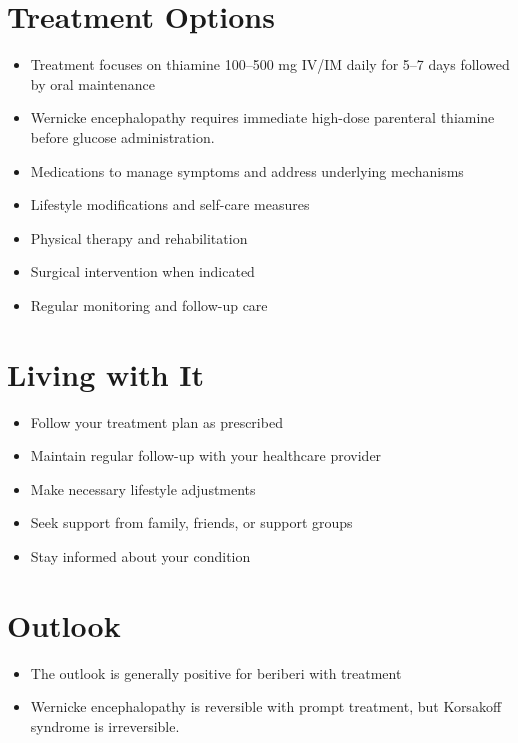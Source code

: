 \section{Treatment Options}
\begin{itemize}[noitemsep]
  \item Treatment focuses on thiamine 100--500 mg IV/IM daily for 5--7 days followed by oral maintenance
  \item Wernicke encephalopathy requires immediate high-dose parenteral thiamine before glucose administration.
  \item Medications to manage symptoms and address underlying mechanisms
  \item Lifestyle modifications and self-care measures
  \item Physical therapy and rehabilitation
  \item Surgical intervention when indicated
  \item Regular monitoring and follow-up care
\end{itemize}
\section{Living with It}
\begin{itemize}[noitemsep]
  \item Follow your treatment plan as prescribed
  \item Maintain regular follow-up with your healthcare provider
  \item Make necessary lifestyle adjustments
  \item Seek support from family, friends, or support groups
  \item Stay informed about your condition
\end{itemize}
\section{Outlook}
\begin{itemize}[noitemsep]
  \item The outlook is generally positive for beriberi with treatment
  \item Wernicke encephalopathy is reversible with prompt treatment, but Korsakoff syndrome is irreversible.
\end{itemize}
